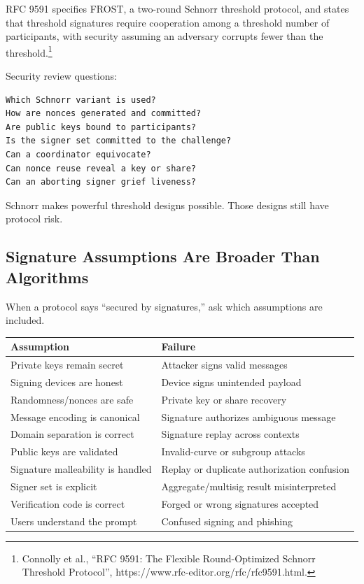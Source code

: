 RFC 9591 specifies FROST, a two-round Schnorr threshold protocol, and
states that threshold signatures require cooperation among a threshold
number of participants, with security assuming an adversary corrupts
fewer than the threshold.\footnote{Connolly et al., ``RFC 9591: The
  Flexible Round-Optimized Schnorr Threshold Protocol'',
  https://www.rfc-editor.org/rfc/rfc9591.html.}

Security review questions:

\begin{lstlisting}
Which Schnorr variant is used?
How are nonces generated and committed?
Are public keys bound to participants?
Is the signer set committed to the challenge?
Can a coordinator equivocate?
Can nonce reuse reveal a key or share?
Can an aborting signer grief liveness?
\end{lstlisting}

Schnorr makes powerful threshold designs possible. Those designs still
have protocol risk.

\subsection{Signature Assumptions Are Broader Than Algorithms}

When a protocol says ``secured by signatures,'' ask which assumptions
are included.

{\def\LTcaptype{none} %
\begin{longtable}[]{@{}
  >{\raggedright\arraybackslash}p{}
  >{\raggedright\arraybackslash}p{}@{}}
\toprule\noalign{}
\begin{minipage}[b]{\linewidth}\raggedright
Assumption
\end{minipage} & \begin{minipage}[b]{\linewidth}\raggedright
Failure
\end{minipage} \\
\midrule\noalign{}
\endhead
\bottomrule\noalign{}
\endlastfoot
Private keys remain secret & Attacker signs valid messages \\
Signing devices are honest & Device signs unintended payload \\
Randomness/nonces are safe & Private key or share recovery \\
Message encoding is canonical & Signature authorizes ambiguous
message \\
Domain separation is correct & Signature replay across contexts \\
Public keys are validated & Invalid-curve or subgroup attacks \\
Signature malleability is handled & Replay or duplicate authorization
confusion \\
Signer set is explicit & Aggregate/multisig result misinterpreted \\
Verification code is correct & Forged or wrong signatures accepted \\
Users understand the prompt & Confused signing and phishing \\
\end{longtable}
}

